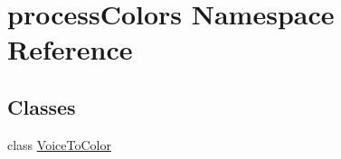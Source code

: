 \hypertarget{namespaceprocessColors}{}\section{process\+Colors Namespace Reference}
\label{namespaceprocessColors}
\subsection*{Classes}
\begin{DoxyCompactItemize}
\item 
class \hyperlink{classprocessColors_1_1VoiceToColor}{Voice\+To\+Color}
\end{DoxyCompactItemize}
